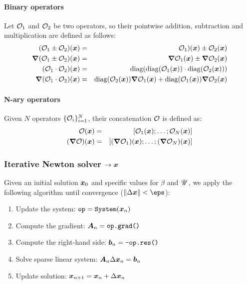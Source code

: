 \paragraph{Binary operators}
Let $\mathcal{O}_1$ and $\mathcal{O}_2$ be two operators, so their pointwise addition, subtraction
and multiplication are defined as follows:
\begin{eqnarray}
(\mathcal{O}_1 \pm \mathcal{O}_2)(\boldsymbol{x}) &=& \mathcal{O}_1)(\boldsymbol{x}) \pm \mathcal{O}_2(\boldsymbol{x}) \\
\boldsymbol{\nabla} (\mathcal{O}_1 \pm \mathcal{O}_2)(\boldsymbol{x})   &=& \boldsymbol{\nabla}\mathcal{O}_1(\boldsymbol{x}) \pm \boldsymbol{\nabla}\mathcal{O}_2(\boldsymbol{x}) \\
(\mathcal{O}_1 \cdot \mathcal{O}_2)(\boldsymbol{x}) &=& \mathrm{diag}(\mathrm{diag}(\mathcal{O}_1(\boldsymbol{x})) \cdot \mathrm{diag}(\mathcal{O}_2(\boldsymbol{x}))) \\
\boldsymbol{\nabla} (\mathcal{O}_1 \cdot \mathcal{O}_2)(\boldsymbol{x}) &=& \mathrm{diag}(\mathcal{O}_2(\boldsymbol{x})) \boldsymbol{\nabla}\mathcal{O}_1(\boldsymbol{x}) 
                                  + \mathrm{diag}(\mathcal{O}_1(\boldsymbol{x})) \boldsymbol{\nabla}\mathcal{O}_2(\boldsymbol{x})
\end{eqnarray}

\paragraph{N-ary operators}
Given $N$ operators $\{\mathcal{O}_i\}_{i=1}^N$, their concatenation $\mathcal{O}$ is defined as:
\begin{eqnarray}
\mathcal{O}(\boldsymbol{x}) &=& [\mathcal{O}_1(\boldsymbol{x}); \ldots; \mathcal{O}_N(\boldsymbol{x})] \\
(\boldsymbol{\nabla}\mathcal{O})(\boldsymbol{x}) &=& [(\boldsymbol{\nabla}\mathcal{O}_1)(\boldsymbol{x}); \ldots; (\boldsymbol{\nabla}\mathcal{O}_N)(\boldsymbol{x})]
\end{eqnarray}

\subsubsection{Iterative Newton solver $\rightarrow \boldsymbol{x}$}
Given an initial solution $\boldsymbol{x}_0$ and specific values for $\beta$ and $\mathscr{U}$, 
we apply the following algorithm 
until convergence ($\|\Delta \bx\| < \eps$):
\begin{enumerate}
\item Update the system: $\verb|op| = \verb|System|(\bx_{n})$
\item Compute the gradient: $\boldsymbol{A}_n = \verb|op.grad()|$
\item Compute the right-hand side: $\boldsymbol{b}_n = \verb|-op.res()|$
\item Solve sparse linear system: $\boldsymbol{A}_n \Delta \boldsymbol{x}_n = \boldsymbol{b}_n$
\item Update solution: $\boldsymbol{x}_{n+1} = \boldsymbol{x}_{n} + \Delta \boldsymbol{x}_{n}$
\end{enumerate}

